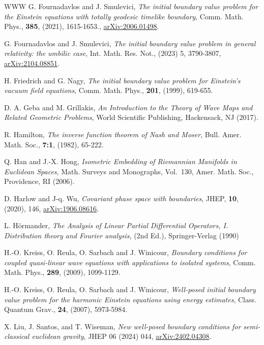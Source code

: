 \documentclass[10pt]{amsart}
\newcommand{\<}{\langle}
\renewcommand{\>}{\rangle}
\theoremstyle{plain}
\theoremstyle{remark}
\theoremstyle{definition}
\numberwithin{equation}{section}
\begin{document}
\begin{thebibliography}{WWW}
 G. Fournadavlos and J. Smulevici, {\it The initial boundary value problem for the Einstein equations with totally geodesic 
timelike boundary}, Comm. Math. Phys., {\bf 385}, (2021), 1615-1653., \href{https://arXiv.org/abs/2006.01498}{arXiv:2006.01498}. 

 G. Fournadavlos and J. Smulevici, {\it The initial boundary value problem in general relativity: the umbilic case},  
Int. Math. Res. Not., (2023) 5, 3790-3807, \href{https://arXiv.org/abs/2104.08851}{arXiv:2104.08851}. 

 H. Friedrich and G. Nagy, {\it The initial boundary value problem for Einstein's vacuum field equations}, 
Comm. Math. Phys., {\bf 201}, (1999), 619-655. 

  D. A. Geba and M. Grillakis, {\it An Introduction to the Theory of Wave Maps and Related Geometric Problems}, 
 World Scientific Publishing, Hackensack, NJ (2017). 
 
  R. Hamilton, {\it The inverse function theorem of Nash and Moser}, Bull. Amer. Math. Soc., {\bf 7:1}, (1982), 65-222. 
 
 Q. Han and J.-X. Hong, {\it Isometric Embedding of Riemannian Manifolds in Euclidean Spaces}, 
Math. Surveys and Monographs, Vol.~130, Amer. Math. Soc., Providence, RI (2006). 

 D. Harlow and J-q. Wu, {\it Covariant phase space with boundaries}, JHEP, {\bf 10}, (2020), 146, 
\href{https://arXiv.org/abs/1906.08616}{arXiv:1906.08616}. 

 L. H\"ormander, {\it The Analysis of Linear Partial Differential Operators, I. Distribution theory and Fourier analysis}, 
(2nd Ed.), Springer-Verlag (1990)

 H.-O. Kreiss, O. Reula, O. Sarbach and J. Winicour, {\it Boundary conditions for coupled quasi-linear wave 
equations with applications to isolated systems}, Comm. Math. Phys., {\bf 289}, (2009), 1099-1129.  

 H.-O. Kreiss, O. Reula, O. Sarbach and J. Winicour, {\it Well-posed initial boundary value problem for the 
harmonic Einstein equations using energy estimates}, Class. Quantum Grav., {\bf 24}, (2007), 5973-5984.

 X. Liu, J. Santos, and T. Wiseman, {\it New well-posed boundary conditions for semi-classical
euclidean gravity}, JHEP 06 (2024) 044, \href{https://arXiv.org/abs/2402.04308}{arXiv:2402.04308}. 


\end{thebibliography}
\end{document}
